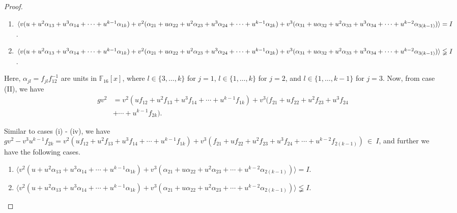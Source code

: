 \documentclass{amsart}
\theoremstyle{definition}
\theoremstyle{remark}
\numberwithin{equation}{section}
\begin{document}
\begin{proof}
        \begin{enumerate}
        \item [(iii)]  $  \langle v(u + u^2\alpha_{13} + u^3\alpha_{14} + \cdots + u^{k-1}\alpha_{1k})
        + v^2( \alpha_{21} + u\alpha_{22} + u^2\alpha_{23} + u^3\alpha_{24} + \cdots + u^{k-1}\alpha_{2k} )\\
        + v^3(  \alpha_{31} + u\alpha_{32} + u^2\alpha_{33} + u^3\alpha_{34} + \cdots + u^{k-2}\alpha_{3(k-1)} )\rangle = I$.
        \item [(iv)] $  \langle v(u + u^2\alpha_{13} + u^3\alpha_{14} + \cdots + u^{k-1}\alpha_{1k})
        + v^2( \alpha_{21} + u\alpha_{22} + u^2\alpha_{23} + u^3\alpha_{24} + \cdots + u^{k-1}\alpha_{2k} )\\
        + v^3(  \alpha_{31} + u\alpha_{32} + u^2\alpha_{33} + u^3\alpha_{34} + \cdots + u^{k-2}\alpha_{3(k-1)} )\rangle \lneqq I$.
        \end{enumerate}
      
        Here, $\alpha_{jl} = f_{jl}f_{12}^{-1}$ are units in $\mathbb{F}_{16}[x]$, where $l \in \{3,\dots,k\}$ for $j = 1$, $l \in \{1,\dots,k\}$ for $j = 2$, and $l \in \{1,\dots,k-1\}$ for $j = 3$. Now, from case (II), we have 
        \begin{align*}
        gv^2 &= v^2(uf_{12} + u^2f_{13} + u^3f_{14} + \cdots + u^{k-1}f_{1k})
        + v^3( f_{21} + uf_{22} + u^2f_{23} + u^3f_{24} \nonumber\\&+ \cdots + u^{k-1}f_{2k} ).
        \end{align*} 
        
        Similar to cases (i) - (iv), we have $gv^2 - v^3u^{k-1}f_{2k} =  v^2(uf_{12} + u^2f_{13} + u^3f_{14} + \cdots + u^{k-1}f_{1k}) + v^3( f_{21} + uf_{22} + u^2f_{23} + u^3f_{24} + \cdots + u^{k-2}f_{2(k-1)}) ~\in~I $, and further we have the following cases.
        
        \begin{enumerate}
        \item [(v)] $  \langle v^2(u + u^2\alpha_{13} + u^3\alpha_{14} + \cdots + u^{k-1}\alpha_{1k})
        + v^3( \alpha_{21} + u\alpha_{22} + u^2\alpha_{23}  + \cdots + u^{k-2}\alpha_{2(k-1)}) \rangle = I$.
        \item [(vi)] $  \langle v^2(u + u^2\alpha_{13} + u^3\alpha_{14} + \cdots + u^{k-1}\alpha_{1k})
        + v^3( \alpha_{21} + u\alpha_{22} + u^2\alpha_{23}  + \cdots + u^{k-2}\alpha_{2(k-1)}) \rangle \lneqq I $.
        \end{enumerate}
      

\end{proof}
\end{document}
